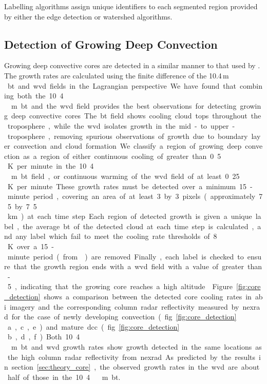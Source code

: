 Labelling algorithms assign unique identifiers to each segmented region provided by either the edge detection or watershed algorithms.


\subsection{Detection of Growing Deep Convection} \label{sec:core_detection}

Growing deep convective cores are detected in a similar manner to that used by \citet{zinner_cb-tram:_2008}.
The growth rates are calculated using the finite difference of the 10.4\,\unit{\mu m } \acrshort{bt} and \acrshort{wvd} fields in the Lagrangian perspective.
We have found that combining both the 10.4\,\unit{\mu m} \acrshort{bt} and the \acrshort{wvd} field provides the best observations for detecting growing deep convective cores.
The \acrshort{bt} field shows cooling cloud tops throughout the troposphere, while the \acrshort{wvd} isolates growth in the mid- to upper-troposphere, removing spurious observations of growth due to boundary layer convection and cloud formation.

We classify a region of growing deep convection as a region of either continuous cooling of greater than 0.5\,\unit{K} per minute in the 10.4\,\unit{\mu m} \acrshort{bt} field, or continuous warming of the \acrshort{wvd} field of at least 0.25\,\unit{K} per minute.
These growth rates must be detected over a minimum 15-minute period, covering an area of at least 3 by 3 pixels (approximately 7.5 by 7.5\,\unit{km}) at each time step.
Each region of detected growth is given a unique label, the average \acrshort{bt} of the detected cloud at each time step is calculated, and any label which fail to meet the cooling rate thresholds of 8\,\unit{K} over a 15-minute period (from \citep{roberts_nowcasting_2003, hartung_intercomparison_2013}) are removed.
Finally, each label is checked to ensure that the growth region ends with a \acrshort{wvd} field with a value of greater than -5, indicating that the growing core reaches a high altitude \citep{muller_role_2018}.

Figure~\ref{fig:core_detection} shows a comparison between the detected core cooling rates in \acrshort{abi} imagery and the corresponding column radar reflectivity measured by \acrshort{nexrad} for the case of newly developing convection (fig.~\ref{fig:core_detection}\,a,c,e) and mature \acrshort{dcc} (fig.~\ref{fig:core_detection}\,b,d,f)
Both 10.4\,\unit{\mu m} \acrshort{bt} and \acrshort{wvd} growth rates show growth detected in the same locations as the high column radar reflectivity from \acrshort{nexrad}.
As predicted by the results in section~\ref{sec:theory_core}, the observed growth rates in the \acrshort{wvd} are about half of those in the 10.4\,\unit{\mu m} \acrshort{bt}.


